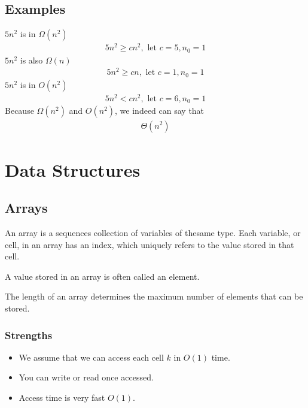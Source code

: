 \documentclass[a4paper]{article}
\theoremstyle{plain}
\theoremstyle{definition}
\newtheorem{defn}{Definition}[section]
\newtheorem{exmp}{Example}[section]
\theoremstyle{remark}
\begin{document}
\subsection{Examples}
\begin{tcolorbox}[colback=black!3!white,colframe=black!60!white,title=\begin{exmp}Example 1 \label{Example 1}\end{exmp}]
        $5n^2$ is in $\Omega(n^2)$
                \begin{align}
                5n^2\ge cn^2, \text{ let } c=5, n_0=1
                \end{align}
	$5n^2$ is also $\Omega(n)$
	\begin{align}
		5n^2\ge cn, \text{ let }c=1, n_0=1
	\end{align}
	$5n^2$ is in $O(n^2)$
	\begin{align}
		5n^2 < cn^2, \text{ let } c=6, n_0=1
	\end{align}
	Because $\Omega(n^2)$ and $O(n^2)$, we indeed can say that
	\begin{align}
		\Theta(n^2)
	\end{align} 
\end{tcolorbox}
\section{Data Structures}
\subsection{Arrays}
\begin{tcolorbox}[colback=black!3!white,colframe=black!60!white,title=\begin{defn}Array \label{Array}\end{defn}]
An array is a sequences collection of variables of thesame type. Each variable, or cell, in an array has an index, which uniquely refers to the value stored in that cell.

A value stored in an array is often called an element.

The length of an array determines the maximum number of elements that can be stored.
\end{tcolorbox}
\subsubsection{Strengths}
\begin{itemize}
	\item We assume that we can access each cell $k$ in $O(1)$ time.
	\item You can write or read once accessed.
	\item Access time is very fast $O(1)$.
\end{itemize}
\end{document}
